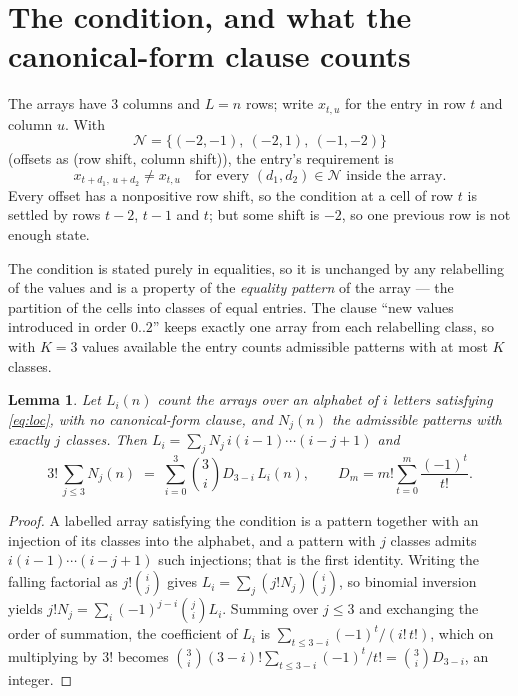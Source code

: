 \documentclass[11pt,a4paper]{article}
\theoremstyle{plain}
\newtheorem{lemma}[theorem]{Lemma}
\theoremstyle{definition}
\begin{document}
\section{The condition, and what the canonical-form clause counts}

The arrays have $3$ columns and $L=n$ rows; write $x_{t,u}$ for the entry in
row $t$ and column $u$. With
\[
\mathcal N=\{(-2,-1),\ (-2,1),\ (-1,-2)\}
\]
(offsets as (row shift, column shift)), the entry's requirement is
\begin{equation}\label{eq:loc}
x_{t+d_1,\,u+d_2}\ne x_{t,u}\quad\text{for every }(d_1,d_2)\in\mathcal N\text{ inside the array}.
\end{equation}
Every offset has a nonpositive row shift, so the condition at a cell of row $t$ is
settled by rows $t-2$, $t-1$ and $t$; but some shift is $-2$, so one previous row is not
enough state.

The condition is stated purely in equalities, so it is unchanged by any relabelling of the
values and is a property of the \emph{equality pattern} of the array --- the partition of
the cells into classes of equal entries. The clause ``new values introduced in order
$0..2$'' keeps exactly one array from each relabelling class, so with $K=3$ values
available the entry counts admissible patterns with at most $K$ classes.

\begin{lemma}\label{lem:inv}
Let $L_i(n)$ count the arrays over an alphabet of $i$ letters satisfying \eqref{eq:loc},
with no canonical-form clause, and $N_j(n)$ the admissible patterns with exactly $j$ classes.
Then $L_i=\sum_j N_j\,i(i-1)\cdots(i-j+1)$ and
\[
3!\,\sum_{j\le 3}N_j(n)\;=\;\sum_{i=0}^{3}\binom{3}{i}D_{3-i}\,L_i(n),
\qquad D_m=m!\sum_{t=0}^{m}\frac{(-1)^t}{t!} .
\]
\end{lemma}

\begin{proof}
A labelled array satisfying the condition is a pattern together with an injection of its
classes into the alphabet, and a pattern with $j$ classes admits $i(i-1)\cdots(i-j+1)$ such
injections; that is the first identity. Writing the falling factorial as $j!\binom{i}{j}$
gives $L_i=\sum_j(j!N_j)\binom{i}{j}$, so binomial inversion yields
$j!N_j=\sum_i(-1)^{j-i}\binom{j}{i}L_i$. Summing over $j\le3$ and exchanging the
order of summation, the coefficient of $L_i$ is $\sum_{t\le3-i}(-1)^t/(i!\,t!)$, which on
multiplying by $3!$ becomes
$\binom{3}{i}(3-i)!\sum_{t\le3-i}(-1)^t/t!=\binom{3}{i}D_{3-i}$, an
integer.
\end{proof}
\end{document}
